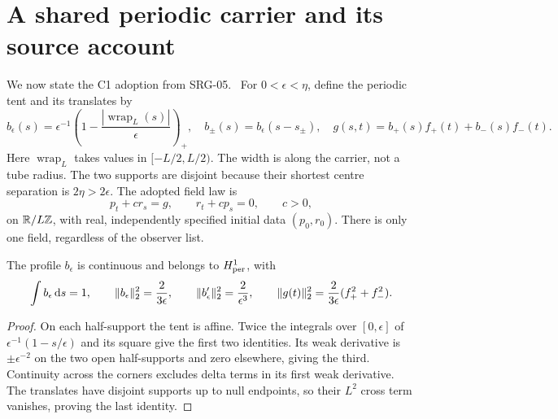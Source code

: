 \section{A shared periodic carrier and its source account}\label{sec:carrier}
We now state the C1 adoption from SRG-05.~\cite{SRG05} For $0<\epsilon<\eta$, define the periodic tent and its translates by
\begin{equation}\label{eq:tent}
 b_\epsilon(s)=\epsilon^{-1}\left(1-\frac{|\operatorname{wrap}_L(s)|}{\epsilon}\right)_+,
 \quad b_\pm(s)=b_\epsilon(s-s_\pm),\quad
 g(s,t)=b_+(s)f_+(t)+b_-(s)f_-(t).
\end{equation}
Here $\operatorname{wrap}_L$ takes values in $[-L/2,L/2)$. The width is along the carrier, not a tube radius. The two supports are disjoint because their shortest centre separation is $2\eta>2\epsilon$. The adopted field law is
\begin{equation}\label{eq:C1}
 \boxed{p_t+c r_s=g,\qquad r_t+c p_s=0,\qquad c>0,}
\end{equation}
on $\mathbb R/L\mathbb Z$, with real, independently specified initial data $(p_0,r_0)$. There is only one field, regardless of the observer list.

\begin{proposition}\label{prop:tent}
The profile $b_\epsilon$ is continuous and belongs to $H^1_{\rm per}$, with
\begin{equation}\label{eq:tentnorm}
 \int b_\epsilon\,\mathrm d s=1,\qquad
 \lVert b_\epsilon\rVert_2^2=\frac2{3\epsilon},\qquad
 \lVert b_\epsilon'\rVert_2^2=\frac2{\epsilon^3},\qquad
 \lVert g(t)\rVert_2^2=\frac2{3\epsilon}(f_+^2+f_-^2).
\end{equation}
\end{proposition}
\begin{proof}
On each half-support the tent is affine. Twice the integrals over $[0,\epsilon]$ of $\epsilon^{-1}(1-s/\epsilon)$ and its square give the first two identities. Its weak derivative is $\pm\epsilon^{-2}$ on the two open half-supports and zero elsewhere, giving the third. Continuity across the corners excludes delta terms in its first weak derivative. The translates have disjoint supports up to null endpoints, so their $L^2$ cross term vanishes, proving the last identity.
\end{proof}

